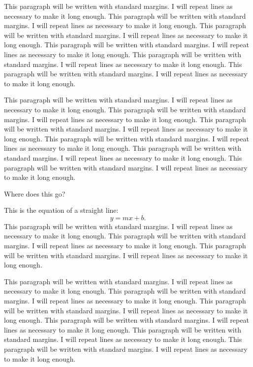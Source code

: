 \documentclass[numbib]{buthesis}  %
\begin{document}
This paragraph will be written with standard margins. I will repeat
lines as necessary to make it long enough. This paragraph will be
written with standard margins. I will repeat lines as necessary to
make it long enough. This paragraph will be written with standard
margins. I will repeat lines as necessary to make it long enough.
This paragraph will be written with standard margins. I will repeat
lines as necessary to make it long enough. This paragraph will be
written with standard margins. I will repeat lines as necessary to
make it long enough. This paragraph will be written with standard
margins. I will repeat lines as necessary to make it long enough.

This paragraph will be written with standard margins. I will repeat
lines as necessary to make it long enough. This paragraph will be
written with standard margins. I will repeat lines as necessary to
make it long enough. This paragraph will be written with standard
margins. I will repeat lines as necessary to make it long enough. This
paragraph will be written with standard margins. I will repeat lines
as necessary to make it long enough. This paragraph will be written
with standard margins. I will repeat lines as necessary to make it
long enough. This paragraph will be written with standard margins. I
will repeat lines as necessary to make it long enough.

Where does this go?

This is the equation of a straight line:
\begin{equation}
y = mx + b.
\end{equation}
This paragraph will be written with standard margins. I will repeat
lines as necessary to make it long enough. This paragraph will be
written with standard margins. I will repeat lines as necessary to
make it long enough. This paragraph will be written with standard
margins. I will repeat lines as necessary to make it long enough.


This paragraph will be written with standard margins. I will repeat
lines as necessary to make it long enough. This paragraph will be
written with standard margins. I will repeat lines as necessary to
make it long enough. This paragraph will be written with standard
margins. I will repeat lines as necessary to make it long enough.
This paragraph will be written with standard margins. I will repeat
lines as necessary to make it long enough. This paragraph will be
written with standard margins. I will repeat lines as necessary to
make it long enough. This paragraph will be written with standard
margins. I will repeat lines as necessary to make it long enough.
\end{document}
